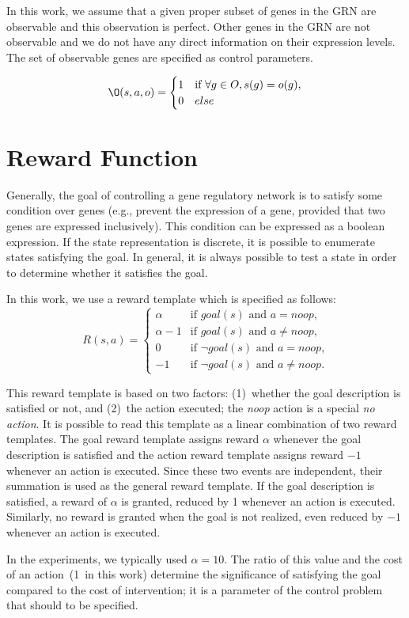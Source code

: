 In this work, we assume that a given proper subset of genes in the GRN are observable and this observation is
perfect. Other genes in the GRN are not observable and we do not have any direct information on their
expression levels. The set of observable genes are specified as control parameters.

\begin{equation}
\O(s,a,o) = 
\begin{cases} 
1 & \text{if } \forall g \in O, s(g) = o(g), \\
0 & else
\end{cases}
\end{equation} 

\section{Reward Function}
Generally, the goal of controlling a gene regulatory network is to satisfy some condition over genes (e.g.,
prevent the expression of a gene, provided that two genes are expressed inclusively). This condition can be
expressed as a boolean expression. If the state representation is discrete, it is possible to enumerate
states satisfying the goal. In general, it is always possible to test a state in order to determine whether
it satisfies the goal.

In this work, we use a reward template which is specified as follows:
\begin{equation*}
R(s,a) =
\begin{cases}
\alpha & \text{if $goal(s)$ and $a = noop$,}\\
\alpha-1 & \text{if $goal(s)$ and $a \ne noop$,}\\
0 & \text{if $\neg goal(s)$ and $a = noop$,}\\
-1 & \text{if $\neg goal(s)$ and $a \ne noop$.}
\end{cases}
\end{equation*}

This reward template is based on two factors: (1)~whether the goal description is satisfied or not, and
(2)~the action executed; the \emph{noop} action is a special \emph{no action}. It is possible to read this
template as a linear combination of two reward templates. The goal reward template assigns reward $\alpha$
whenever the goal description is satisfied and the action reward template assigns reward $-1$ whenever an
action is executed. Since these two events are independent, their summation is used as the general reward
template. If the goal description is satisfied, a reward of $\alpha$ is granted, reduced by 1 whenever an
action is executed. Similarly, no reward is granted when the goal is not realized, even reduced by $-1$
whenever an action is executed.

In the experiments, we typically used $\alpha=10$. The ratio of this value and the cost of an action~(1~in
this work) determine the significance of satisfying the goal compared to the cost of intervention; it is a
parameter of the control problem that should to be specified.

